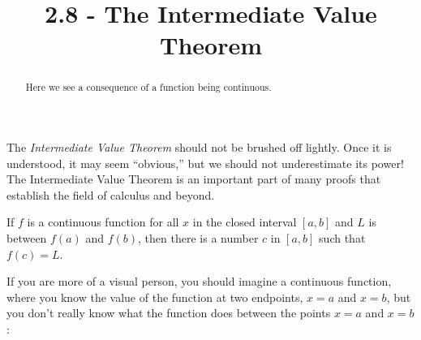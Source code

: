 \documentclass{ximera}
\title{2.8 - The Intermediate Value Theorem}
\begin{document}
\begin{abstract}
  Here we see a consequence of a function being continuous.
\end{abstract}
\maketitle



The \textit{Intermediate Value Theorem} should not be brushed off
lightly. Once it is understood, it may seem ``obvious,'' but
we should not underestimate its power! The Intermediate Value Theorem is an important part of many proofs that establish the field of calculus and beyond.

\begin{theorem}\label{theorem:IVT}
	If $f$ is a continuous function for all $x$ in the closed interval
	$[a,b]$ and $L$ is between $f(a)$ and $f(b)$, then there is a number
	$c$ in $[a, b]$ such that $f(c) = L$.
\end{theorem}


If you are more of a visual person, you should imagine a continuous
function, where you know the value of the function at two endpoints,
$x=a$ and $x=b$, but you don't really know what the function does
between the points $x=a$ and $x=b$:
\end{document}
